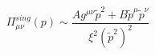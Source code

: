 \begin{equation} 
\Pi_{\mu \nu}^{sing}(p) \sim \frac{Ag^{\mu 
\nu}\tilde{p}^2+B\tilde{p}^{\mu} \tilde{p}^{\nu}}{ \xi^2(\tilde{p}^2)^2} 
 \label{22} 
\end{equation} 
